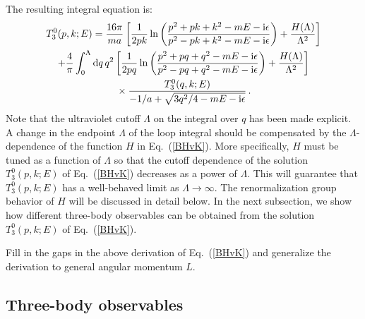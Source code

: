 The resulting integral equation is:
\begin{multline}
 T_3^0 (p, k; E)  = \frac{16 \pi}{m a} 
 \left[ \frac{1}{2pk} \ln \left(\frac{p^2 + pk + k^2 -mE - \ii \epsilon}
 {p^2 - pk + k^2 - mE - \ii \epsilon}\right) + \frac{H(\Lambda)}{\Lambda^2} 
 \right] \\
 + \frac{4}{\pi} \int_0^\Lambda \dd q \, q^2
 \left[\frac{1}{2pq} \ln\left( \frac{p^2 +pq + q^2 - mE - \ii \epsilon}
 {p^2 - pq + q^2 -mE -\ii \epsilon}\right)
 + \frac{H(\Lambda)}{\Lambda^2} \right] \\
 \null \times \frac{ T_3^0 (q, k; E)}
 {{-}1/a + \sqrt{3q^2/4 -mE - \ii\epsilon}} \,.
\label{BHvK}
\end{multline}
Note that the ultraviolet cutoff $\Lambda$ on the
integral over $q$ has been made explicit. 
A change in the endpoint $\Lambda$ of the loop integral
should be compensated by the $\Lambda$-dependence of the function 
$H$ in Eq.~(\ref{BHvK}).
More specifically, $H$ must be tuned as a function of $\Lambda$ 
so that the cutoff dependence of the solution $T_3^0 (p, k; E)$
of Eq.~(\ref{BHvK}) decreases as a power of $\Lambda$.  This will 
guarantee that $T_3^0 (p, k; E)$ has a well-behaved limit 
as $\Lambda \to \infty$. The renormalization group behavior of
$H$ will be discussed in detail below. In the next subsection, we 
show how
different three-body observables can be obtained from the 
solution $T_3^0 (p, k; E)$ of Eq.~(\ref{BHvK}).

\begin{prob}
Fill in the gaps in the above derivation of Eq.~(\ref{BHvK}) and
generalize the derivation to general angular momentum $L$.
\end{prob}


\subsection{Three-body observables}
\label{sec:EFT-3BObs}

